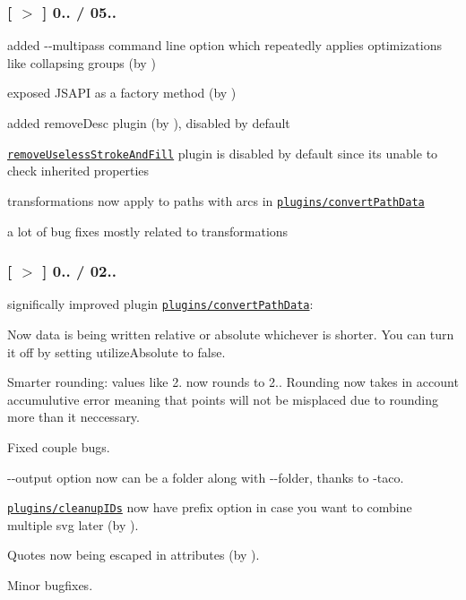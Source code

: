 \subsubsection*{\mbox{[} \href{https://github.com/svg/svgo/tree/v0.5.0}{\tt $>$} \mbox{]} 0.. / 05..}


\begin{DoxyItemize}
\item added {\ttfamily -\/-\/multipass} command line option which repeatedly applies optimizations like collapsing groups (by )
\item exposed J\+S\+A\+PI as a factory method (by )
\item added remove\+Desc plugin (by ), disabled by default
\item \href{https://github.com/svg/svgo/blob/master/plugins/removeUselessStrokeAndFill.js}{\tt remove\+Useless\+Stroke\+And\+Fill} plugin is disabled by default since it\textquotesingle{}s unable to check inherited properties
\item transformations now apply to paths with arcs in \href{https://github.com/svg/svgo/blob/master/plugins/convertPathData.js}{\tt plugins/convert\+Path\+Data}
\item a lot of bug fixes mostly related to transformations
\end{DoxyItemize}

\subsubsection*{\mbox{[} \href{https://github.com/svg/svgo/tree/v0.4.5}{\tt $>$} \mbox{]} 0.. / 02..}


\begin{DoxyItemize}
\item significally improved plugin \href{https://github.com/svg/svgo/blob/master/plugins/convertPathData.js}{\tt plugins/convert\+Path\+Data}\+:
\begin{DoxyItemize}
\item Now data is being written relative or absolute whichever is shorter. You can turn it off by setting {\ttfamily utilize\+Absolute} to {\ttfamily false}.
\item Smarter rounding\+: values like 2. now rounds to 2.. Rounding now takes in account accumulutive error meaning that points will not be misplaced due to rounding more than it neccessary.
\item Fixed couple bugs.
\end{DoxyItemize}
\item {\ttfamily -\/-\/output} option now can be a folder along with {\ttfamily -\/-\/folder}, thanks to -\/taco.
\item \href{https://github.com/svg/svgo/blob/master/plugins/cleanupIDs.js}{\tt plugins/cleanup\+I\+Ds} now have {\ttfamily prefix} option in case you want to combine multiple svg later (by ).
\item Quotes now being escaped in attributes (by ).
\item Minor bugfixes.
\end{DoxyItemize}

